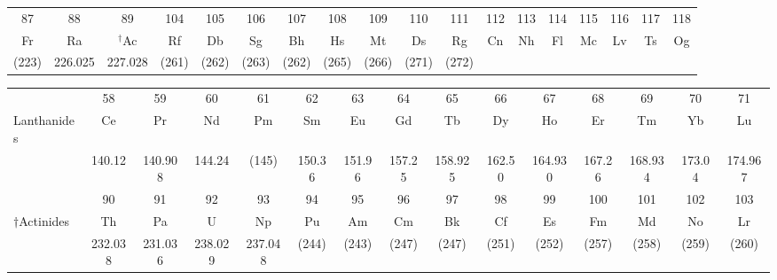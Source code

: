 \documentclass[10pt,landscape]{article}
\begin{document}
\begin{center}
\begin{tabular}{|c*{16}{|c}|c|}
\hline
\small 87 & \small 88 & \small 89 & \small 104 & \small 105 & \small 106 & \small 107 & \small 108 & \small 109 & \small 110 & \small 111 & \small 112 & \small 113 & \small 114  & \small 115 & \small 116 & \small 117 & \small 118 \tabularnewline [-1mm]
Fr & Ra & $^\dagger$Ac & Rf & Db & Sg & Bh & Hs & Mt & Ds & Rg & Cn & Nh & Fl & Mc & Lv & Ts & Og\tabularnewline [-2mm]
\small (223) & \small 226.025 & \small 227.028 & \small (261) & \small (262) & \small (263) & \small (262) & \small (265) & \small (266) & \small (271)  & \small (272) &  & & & & & & \\
\end{tabular}
\end{center}
\vspace{0.5cm}
\hspace{-0.2cm}
\begin{tabular}{|p{3.5cm}|*{14}{c|}}
\hline
&\small 58 & \small 59 & \small 60 & \small 61 & \small 62 & \small 63 & \small 64 & \small 65 & \small 66 & \small 67 & \small 68 & \small 69 & \small 70 & \small 71  \\[-1mm]
 \sc *Lanthanides & Ce & Pr & Nd & Pm & Sm & Eu & Gd & Tb & Dy & Ho & Er & Tm & Yb & Lu\\[-2mm]
&\small 140.12 & \small 140.908 & \small 144.24 & \small (145) & \small 150.36 & \small 151.96 & \small 157.25 & \small 158.925 & \small 162.50 & \small 164.930 & \small 167.26 & \small 168.934 & \small 173.04 & \small 174.967 \\[-1mm]
\hline
&\small 90 & \small 91 & \small 92 & \small 93 & \small 94 & \small 95 & \small 96 & \small 97 & \small 98 & \small 99 & \small 100 & \small 101 & \small 102 & \small 103  \\[-1mm]
 \sc $\dagger$Actinides & Th & Pa & U & Np & Pu & Am & Cm & Bk & Cf & Es & Fm & Md & No & Lr\\[-2mm]
&\small 232.038  & \small 231.036 & \small 238.029 & \small 237.048 & \small (244) & \small (243) & \small (247) & \small (247) & \small (251) & \small (252) & \small (257) & \small (258) & \small (259) & \small (260)\\
\hline
\end{tabular}
\end{document}
